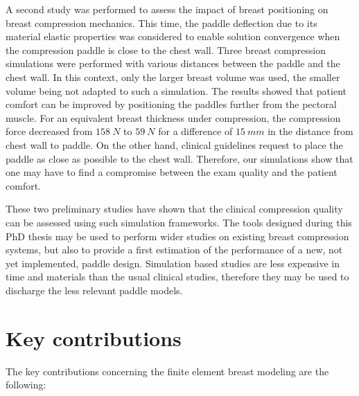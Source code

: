 A second study was performed to assess the impact of breast positioning on breast compression mechanics. This time, the paddle deflection due to its material elastic properties was considered to enable solution convergence when the compression paddle is close to the chest wall. Three breast compression simulations were performed with various distances between the paddle and the chest wall. In this context, only the larger breast volume was used, the smaller volume being not adapted to such a simulation. The results showed that patient comfort can be improved by positioning the paddles further from the pectoral muscle. For an equivalent breast thickness under compression, the compression force decreased from $158\ N$ to $59\ N$ for a difference of $15\ mm$ in the distance from chest wall to paddle. On the other hand, clinical guidelines request to place the paddle as close as possible to the chest wall. Therefore, our simulations show that one may have to find a compromise between the exam quality and the patient comfort. 

These two preliminary studies have shown that the clinical compression quality can be assessed using such simulation frameworks. The tools designed during this PhD thesis may be used to perform wider studies on existing breast compression systems, but also to provide a first estimation of the performance of a new, not yet implemented, paddle design. Simulation based studies are less expensive in time and materials than the usual clinical studies, therefore they may be used to discharge the less relevant paddle models.

\cleardoublepage



\chapter*{Key contributions}\label{section:keycontributions}

The key contributions concerning the finite element breast modeling are the following:

